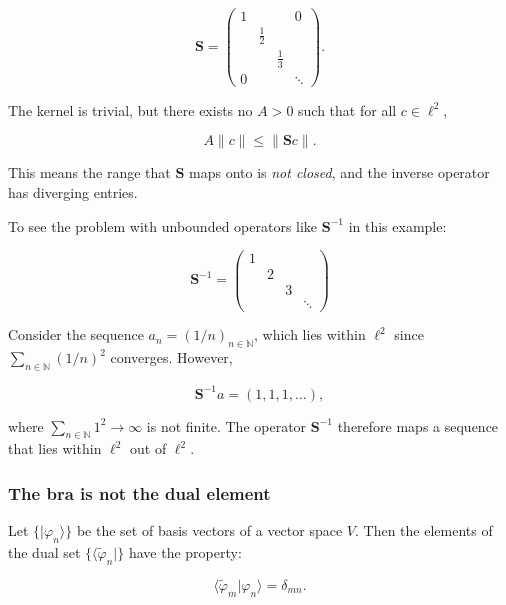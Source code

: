 \begin{equation}
\mathbf{S} = \begin{pmatrix} 1 & & & 0 \\ & \tfrac12 & & \\ & & \tfrac13 & \\ 0 & & & \ddots \end{pmatrix}.
\end{equation}

The kernel is trivial, but there exists no $A>0$ such that for all
$c\in\ell^2$,

\begin{equation}
A\|c\| \le \|\mathbf{S}c\|.
\end{equation}

This means the range that $\mathbf{S}$ maps onto is \emph{not closed},
and the inverse operator has diverging entries.

To see the problem with unbounded operators like $\mathbf{S}^{-1}$ in this
example:

\begin{equation}
\mathbf{S}^{-1} = \begin{pmatrix} 1 & & & \\ & 2 & & \\ & & 3 & \\ & & & \ddots \end{pmatrix}
\end{equation}

Consider the sequence $a_n = (1/n)_{n\in\mathbb{N}}$, which lies within
$\ell^2$ since $\sum_{n\in\mathbb{N}}(1/n)^2$ converges. However,

\begin{equation}
\mathbf{S}^{-1}a = (1,1,1,\dots),
\end{equation}

where $\sum_{n\in\mathbb{N}}1^2\to\infty$ is not finite. The operator
$\mathbf{S}^{-1}$ therefore maps a sequence that lies within $\ell^2$
out of $\ell^2$.

\subsubsection*{The bra is not the dual element}

Let $\{|\varphi_n\rangle\}$ be the set of basis vectors of a vector
space $V$. Then the elements of the dual set $\{\langle\tilde\varphi_n|\}$
have the property:

\begin{equation}
\langle\tilde\varphi_m|\varphi_n\rangle = \delta_{mn}.
\end{equation}

